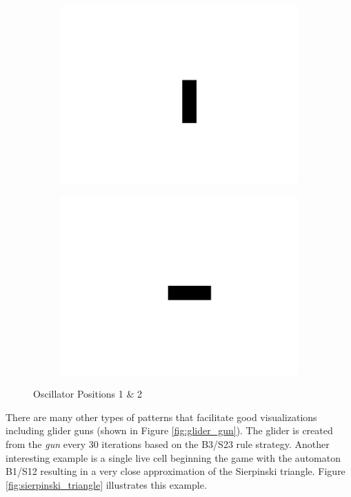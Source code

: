 \documentclass[11pt]{article}
\begin{document}
\begin{figure}[!ht]
	\centering
	\begin{subfigure}{.45\textwidth}
		\centering
  	  	\includegraphics[width=1\linewidth]{images/blinker1.png}
  	  	\label{fig:blinker1}
	\end{subfigure}
	\begin{subfigure}{.45\textwidth}
  	  	\centering
  	  	\includegraphics[width=1\linewidth]{images/blinker2.png}
  	  	\label{fig:blinker2}
	\end{subfigure}
	\caption{Oscillator Positions 1 \& 2}
	\label{fig:oscillator}
\end{figure}

There are many other types of patterns that facilitate good visualizations including glider guns (shown in Figure \ref{fig:glider_gun}).  The glider is created from the \textit{gun} every 30 iterations based on the B3/S23 rule strategy.  Another interesting example is a single live cell beginning the game with the automaton B1/S12 resulting in a very close approximation of the Sierpinski triangle.  Figure \ref{fig:sierpinski_triangle} illustrates this example.
\end{document}
